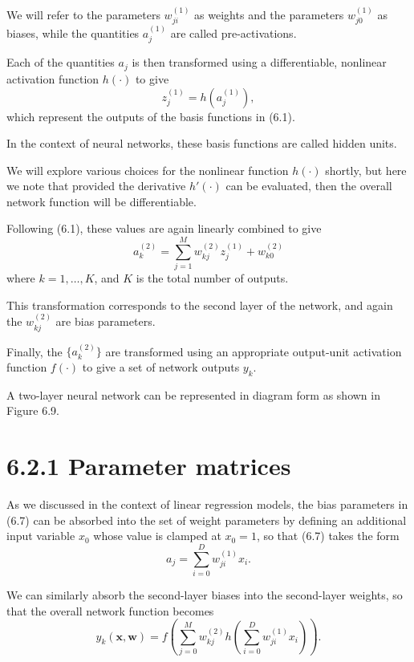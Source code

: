 \documentclass{article}
\begin{document}
We will refer to the parameters $w_{ji}^{(1)}$ as weights and the parameters $w_{j0}^{(1)}$ as biases, while the quantities $a_j^{(1)}$ are called pre-activations. 

Each of the quantities $a_j$ is then transformed using a differentiable, nonlinear activation function $h(\cdot)$ to give
\begin{equation}
z_j^{(1)} = h(a_j^{(1)}), \tag{6.8}
\end{equation}
which represent the outputs of the basis functions in (6.1). 

In the context of neural networks, these basis functions are called hidden units. 

We will explore various choices for the nonlinear function $h(\cdot)$ shortly, but here we note that provided the derivative $h'(\cdot)$ can be evaluated, then the overall network function will be differentiable. 

Following (6.1), these values are again linearly combined to give
\begin{equation}
a_k^{(2)} = \sum_{j=1}^{M} w_{kj}^{(2)} z_j^{(1)} + w_{k0}^{(2)} \tag{6.9}
\end{equation}
where $k = 1, \ldots, K$, and $K$ is the total number of outputs. 

This transformation corresponds to the second layer of the network, and again the $w_{kj}^{(2)}$ are bias parameters. 

Finally, the $\{a_k^{(2)}\}$ are transformed using an appropriate output-unit activation function $f(\cdot)$ to give a set of network outputs $y_k$. 

A two-layer neural network can be represented in diagram form as shown in Figure 6.9.


\section{6.2.1 Parameter matrices}

As we discussed in the context of linear regression models, the bias parameters in (6.7) can be absorbed into the set of weight parameters by defining an additional input variable $x_0$ whose value is clamped at $x_0 = 1$, so that (6.7) takes the form
\begin{equation}
a_j = \sum_{i=0}^{D} w_{ji}^{(1)} x_i. 
\tag{6.10}
\end{equation}

We can similarly absorb the second-layer biases into the second-layer weights, so that the overall network function becomes
\begin{equation}
y_k(\mathbf{x}, \mathbf{w}) = f\left( \sum_{j=0}^{M} w_{kj}^{(2)} h\left( \sum_{i=0}^{D} w_{ji}^{(1)} x_i \right) \right). 
\tag{6.11}
\end{equation}
\end{document}
